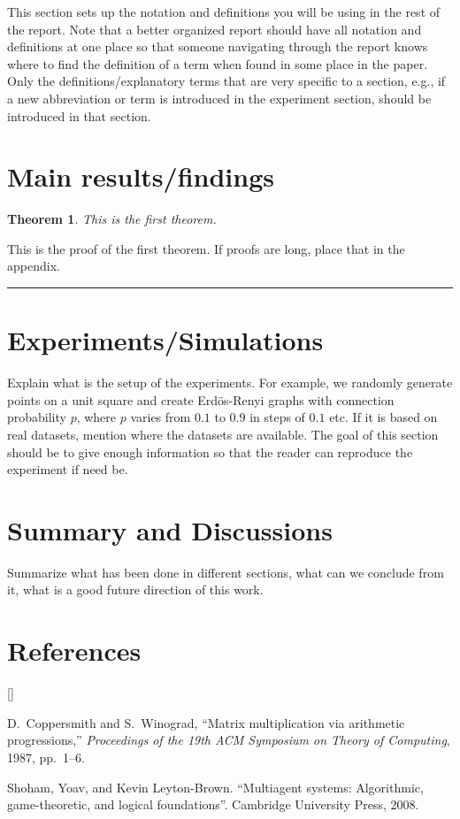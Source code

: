 \documentclass[twoside]{article}
\def\beginrefs{\begin{list}%
        {[\arabic{equation}]}{\usecounter{equation}
         \setlength{\leftmargin}{2.0truecm}\setlength{\labelsep}{0.4truecm}%
         \setlength{\labelwidth}{1.6truecm}}}
\def\endrefs{\end{list}}
\def\bibentry#1{\item[\hbox{[#1]}]}
\newtheorem{theorem}{Theorem}%
\newenvironment{proof}{{\bf Proof:}}{\hfill\rule{2mm}{2mm}}
\begin{document}
This section sets up the notation and definitions you will be using in the rest of the report. Note that a better organized report should have all notation and definitions at one place so that someone navigating through the report knows where to find the definition of a term when found in some place in the paper. Only the definitions/explanatory terms that are very specific to a section, e.g., if a new abbreviation or term is introduced in the experiment section, should be introduced in that section.

\section{Main results/findings}

\begin{theorem}
\label{thm:first}
This is the first theorem.
\end{theorem}

\begin{proof}
This is the proof of the first theorem. If proofs are long, place that in the appendix.
\end{proof}


\section{Experiments/Simulations}

Explain what is the setup of the experiments. For example, we randomly generate points on a unit square and create Erd\"os-Renyi graphs with connection probability $p$, where $p$ varies from $0.1$ to $0.9$ in steps of $0.1$ etc. If it is based on real datasets, mention where the datasets are available. The goal of this section should be to give enough information so that the reader can reproduce the experiment if need be.

\section{Summary and Discussions}

Summarize what has been done in different sections, what can we conclude from it, what is a good future direction of this work.

\section*{References}
\beginrefs
\bibentry{CW87}{\sc D.~Coppersmith} and {\sc S.~Winograd}, 
``Matrix multiplication via arithmetic progressions,''
{\it Proceedings of the 19th ACM Symposium on Theory of Computing},
1987, pp.~1--6.
\bibentry{SLB08}Shoham, Yoav, and Kevin Leyton-Brown. ``Multiagent systems: Algorithmic, game-theoretic, and logical foundations''. Cambridge University Press, 2008.
\endrefs
\end{document}
